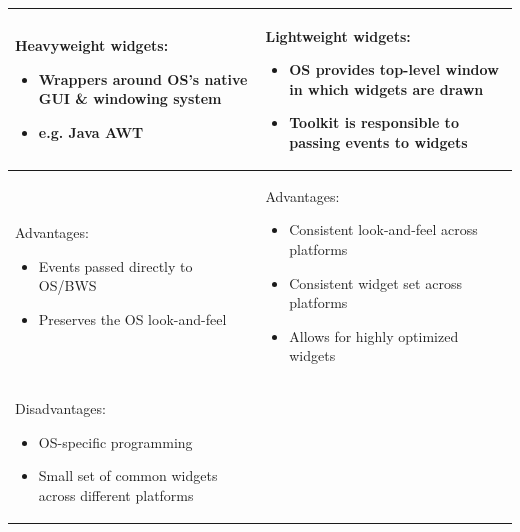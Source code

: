 \documentclass[11pt, oneside]{article}
\newenvironment{itemized}{\begin{itemize}[noitemsep, topsep=0pt, leftmargin=*]}{\end{itemize}}  %
\begin{document}
\hspace{-2em}
\begin{tabular}{|l|l|}
\hline
\begin{minipage}[t]{0.45\textwidth}
\textbf{Heavyweight widgets}:
    \begin{itemized}
    \item Wrappers around OS's native GUI \& windowing system 
    \item e.g. Java AWT
    \end{itemized}
    \vspace*{0.5em}
\end{minipage}
&
\begin{minipage}[t]{0.45\textwidth}
\textbf{Lightweight widgets}:
    \begin{itemized}
    \item OS provides top-level window in which widgets are drawn
    \item Toolkit is responsible to passing events to widgets
    \end{itemized}
    \vspace*{0.5em}
\end{minipage}  \\
\hline
\begin{minipage}[t]{0.45\textwidth}
Advantages:
    \begin{itemized}
    \item Events passed directly to OS/BWS
    \item Preserves the OS look-and-feel
    \end{itemized}
    \vspace*{0.5em}
\end{minipage}
&
\begin{minipage}[t]{0.45\textwidth}
Advantages:
    \begin{itemized}
    \item Consistent look-and-feel across platforms
    \item Consistent widget set across platforms
    \item Allows for highly optimized widgets
    \end{itemized}
    \vspace*{0.5em}
\end{minipage}  \\
\hline
\begin{minipage}[t]{0.45\textwidth}
Disadvantages:
    \begin{itemized}
    \item OS-specific programming
    \item Small set of common widgets across different platforms

\end{itemized}
\end{minipage}
\end{tabular}
\end{document}
